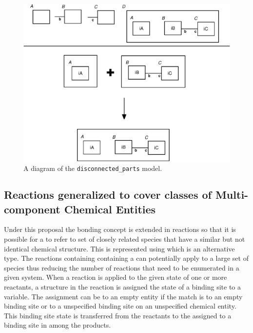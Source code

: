 \documentclass{cekarticle}
\begin{document}
\begin{figure}[h]
  \vspace*{8pt}
  \centering
  \includegraphics[scale = 0.7]{disconnected_parts.eps}
  \caption{A diagram of the \texttt{disconnected\_parts} model.}
  \label{fig:disconnected_parts}
\end{figure}

\subsection{Reactions generalized to cover classes of Multi-component Chemical Entities}
\label{sec:generalizedreactions}

Under this proposal the bonding concept is extended in reactions so that it is possible 
for a  to refer to set of closely related species that have a 
similar but not identical chemical structure.  
This is represented using  which is an
alternative  type.  The reactions containing containing a  can potentially
apply to a large set of species thus reducing the number of reactions that need to be enumerated in
a given system.
When a reaction is applied to the given state of one or more reactants, a  structure
in the reaction is assigned the state of a binding site to a variable.  The assignment can be to
an empty entity if the match is to an empty binding site or to a unspecified binding site on
an unspecified chemical entity.  This binding site state is transferred from the reactants to the
assigned to a binding site in among the products.
\end{document}
